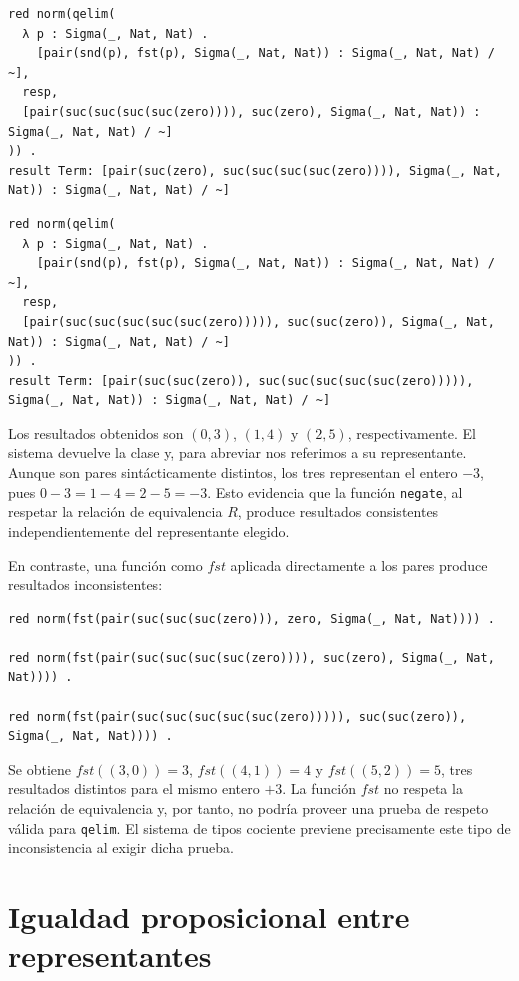 \begin{lstlisting}
red norm(qelim(
  λ p : Sigma(_, Nat, Nat) .
    [pair(snd(p), fst(p), Sigma(_, Nat, Nat)) : Sigma(_, Nat, Nat) / ~],
  resp,
  [pair(suc(suc(suc(suc(zero)))), suc(zero), Sigma(_, Nat, Nat)) : Sigma(_, Nat, Nat) / ~]
)) .
result Term: [pair(suc(zero), suc(suc(suc(suc(zero)))), Sigma(_, Nat, Nat)) : Sigma(_, Nat, Nat) / ~]
\end{lstlisting}

\begin{lstlisting}
red norm(qelim(
  λ p : Sigma(_, Nat, Nat) .
    [pair(snd(p), fst(p), Sigma(_, Nat, Nat)) : Sigma(_, Nat, Nat) / ~],
  resp,
  [pair(suc(suc(suc(suc(suc(zero))))), suc(suc(zero)), Sigma(_, Nat, Nat)) : Sigma(_, Nat, Nat) / ~]
)) .
result Term: [pair(suc(suc(zero)), suc(suc(suc(suc(suc(zero))))), Sigma(_, Nat, Nat)) : Sigma(_, Nat, Nat) / ~]
\end{lstlisting}

Los resultados obtenidos son $(0, 3)$, $(1, 4)$ y $(2, 5)$, respectivamente. El sistema devuelve la clase y, para abreviar nos referimos a su representante. Aunque son pares
sintácticamente distintos, los tres representan el entero $-3$, pues
$0 - 3 = 1 - 4 = 2 - 5 = -3$. Esto evidencia que la función \texttt{negate},
al respetar la relación de equivalencia $R$, produce resultados consistentes
independientemente del representante elegido.

En contraste, una función como $fst$ aplicada directamente a los pares produce resultados inconsistentes:

\begin{lstlisting}
red norm(fst(pair(suc(suc(suc(zero))), zero, Sigma(_, Nat, Nat)))) .

red norm(fst(pair(suc(suc(suc(suc(zero)))), suc(zero), Sigma(_, Nat, Nat)))) .

red norm(fst(pair(suc(suc(suc(suc(suc(zero))))), suc(suc(zero)), Sigma(_, Nat, Nat)))) .
\end{lstlisting}

Se obtiene $fst((3, 0)) = 3$, $fst((4, 1)) = 4$ y $fst((5, 2)) = 5$, tres resultados distintos para el mismo entero $+3$. La función $fst$ no respeta la relación de equivalencia y, por tanto, no podría proveer una prueba de respeto válida para \texttt{qelim}. El sistema de tipos cociente previene precisamente este tipo de inconsistencia al exigir dicha prueba.

\section{Igualdad proposicional entre representantes}

